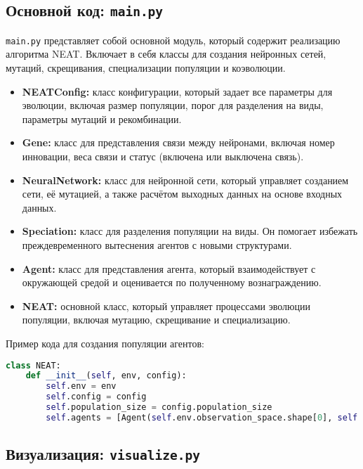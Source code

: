 \documentclass[a4paper,12pt]{article}
\begin{document}
\subsection{Основной код: \texttt{main.py}}

\texttt{main.py} представляет собой основной модуль, который содержит реализацию алгоритма NEAT. Включает в себя классы для создания нейронных сетей, мутаций, скрещивания, специализации популяции и коэволюции.

\begin{itemize}
    \item \textbf{NEATConfig:} класс конфигурации, который задает все параметры для эволюции, включая размер популяции, порог для разделения на виды, параметры мутаций и рекомбинации.
    \item \textbf{Gene:} класс для представления связи между нейронами, включая номер инновации, веса связи и статус (включена или выключена связь).
    \item \textbf{NeuralNetwork:} класс для нейронной сети, который управляет созданием сети, её мутацией, а также расчётом выходных данных на основе входных данных.
    \item \textbf{Speciation:} класс для разделения популяции на виды. Он помогает избежать преждевременного вытеснения агентов с новыми структурами.
    \item \textbf{Agent:} класс для представления агента, который взаимодействует с окружающей средой и оценивается по полученному вознаграждению.
    \item \textbf{NEAT:} основной класс, который управляет процессами эволюции популяции, включая мутацию, скрещивание и специализацию.
\end{itemize}

Пример кода для создания популяции агентов:

\begin{lstlisting}[language=Python]
class NEAT:
    def __init__(self, env, config):
        self.env = env
        self.config = config
        self.population_size = config.population_size
        self.agents = [Agent(self.env.observation_space.shape[0], self.env.action_space.shape[0]) for _ in range(self.population_size)]
\end{lstlisting}

\subsection{Визуализация: \texttt{visualize.py}}
\end{document}
